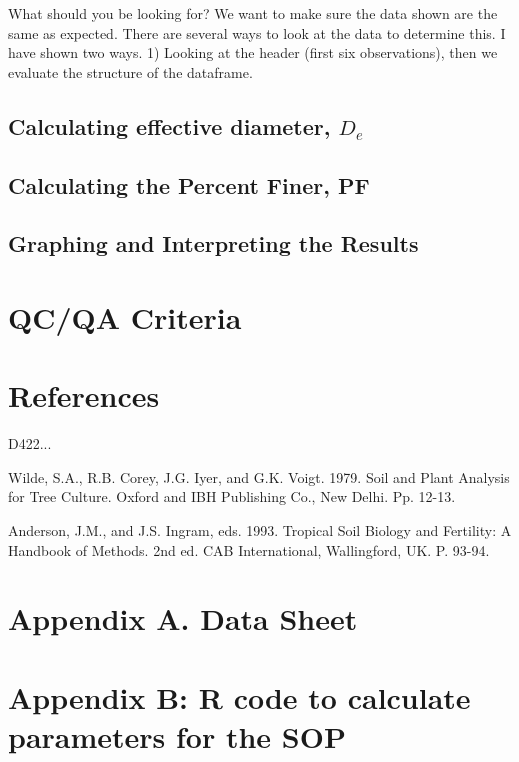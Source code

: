 \documentclass[12pt]{../SOP4_alpha}\usepackage[]{graphicx}\usepackage[]{xcolor}
\begin{document}
What should you be looking for?  We want to make sure the data shown are the same as expected. There are several ways to look at the data to determine this. I have shown two ways. 1) Looking at the header (first six observations), then we evaluate the structure of the dataframe.
 
\subsection{Calculating effective diameter, $D_e$}


\subsection{Calculating the Percent Finer, PF}


\subsection{Graphing and Interpreting the Results}

\section{QC/QA Criteria}

\section{References}

\NP D422...

\NP Wilde, S.A., R.B. Corey, J.G. Iyer, and G.K. Voigt.  1979.  Soil and Plant Analysis for Tree Culture.  Oxford and IBH Publishing Co., New Delhi.  Pp. 12-13.

\NP Anderson, J.M., and J.S. Ingram, eds.  1993.  Tropical Soil Biology and Fertility:  A Handbook of Methods. 2nd ed.  CAB International, Wallingford, UK.  P. 93-94.

\section{Appendix A. Data Sheet}




\newpage
\section{Appendix B: R code to calculate parameters for the SOP}

% 	
\end{document}
